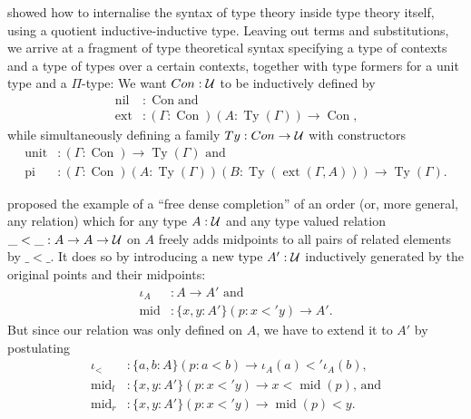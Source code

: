 \begin{example}\label{ex:ttintt}
\cite{ttintt} showed how to internalise the syntax of type theory inside type
theory itself, using a quotient inductive-inductive type.
Leaving out terms and substitutions, we arrive at a fragment of type theoretical
syntax specifying a type of contexts and a type of types over a certain contexts,
together with type formers for a unit type and a $\Pi$-type:
We want $\mathop{Con} : \mathcal{U}$ to be inductively defined by
\begin{align*}
\mathop{nil}	&: \mathop{Con} \text{and } \\
\mathop{ext}	&: (\Gamma : \mathop{Con})(A : \mathop{Ty}(\Gamma)) \to \mathop{Con} \text{,}
\end{align*}
while simultaneously defining a family $\mathop{Ty} : \mathop{Con} \to \mathcal{U}$ with constructors
\begin{align*}
\mathop{unit}	&: (\Gamma : \mathop{Con}) \to \mathop{Ty}(\Gamma) \text{ and} \\
\mathop{pi}	&: (\Gamma : \mathop{Con})(A : \mathop{Ty}(\Gamma))(B : \mathop{Ty}(\mathop{ext}(\Gamma, A))) \to \mathop{Ty}(\Gamma) \text{.}
\end{align*}
\end{example}

\begin{example}
\citet{nordvallinductive} proposed the example of a ``free dense completion'' of
an order (or, more general, any relation) which for any type $A : \mathcal{U}$ and
any type valued relation $\_<\_ : A \to A \to \mathcal{U}$ on $A$ freely adds midpoints
to all pairs of related elements by $\_<\_$.
It does so by introducing a new type $A' : \mathcal{U}$ inductively generated by the
original points and their midpoints:
\begin{align*}
\iota_A		&: A \to A' \text{ and} \\
\mathop{mid}	&: \{x, y : A'\}(p : x <' y) \to A' \text{.}
\end{align*}
But since our relation was only defined on $A$, we have to extend it to $A'$ by
postulating
\begin{align*}
\iota_<		&: \{a, b : A\}(p : a < b) \to \iota_A(a) <' \iota_A(b) \text{,} \\
\mathop{mid}_l	&: \{x, y : A'\}(p : x <' y) \to x < \mathop{mid}(p) \text{, and} \\
\mathop{mid}_r	&: \{x, y : A'\}(p : x <' y) \to \mathop{mid}(p) < y \text{.}
\end{align*}
\end{example}

